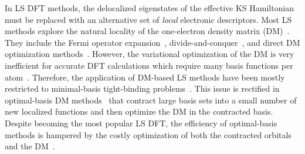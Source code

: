 \documentclass[aps,prl,twocolumn,reprint,amsmath,amssymb]{revtex4-1}
\begin{document}
In LS DFT methods, the delocalized eigenstates of the effective KS Hamiltonian must be replaced with an alternative set of \emph{local} electronic descriptors. 
Most LS methods explore the natural locality of the one-electron density matrix (DM)~\cite{li1993density, lee1996linear, li2003density, vandevondele2012linear, Kussmann2013, Aarons2016, shao2003curvy}.  
They include the Fermi operator expansion~\cite{goedecker1994efficient,goedecker1995tight}, divide-and-conquer~\cite{yang1991direct,yang1991local}, and direct DM optimization methods~\cite{li1993density, shao2003curvy, vandevondele2012linear}. 
However, the variational optimization of the DM is very inefficient for accurate DFT calculations which require many basis functions per atom~\cite{goedecker1999linear,a:ls-dm-sign, Arita2014, a:ls-rev-2012, a:almo-ls}.
Therefore, the application of DM-based LS methods have been mostly restricted to minimal-basis tight-binding problems~\cite{Richters2014, example-of-a-large-scale-tight-binding}. 
This issue is rectified in optimal-basis DM methods~\cite{Skylaris2005, Nakata2015, Mohr2015} that contract large basis sets into a small number of new localized functions and then optimize the DM in the contracted basis. 
Despite becoming the most popular LS DFT, the efficiency of optimal-basis methods is hampered by the costly optimization of both the contracted orbitals and the DM~\cite{a:ls-onetep-2003}.
\end{document}
